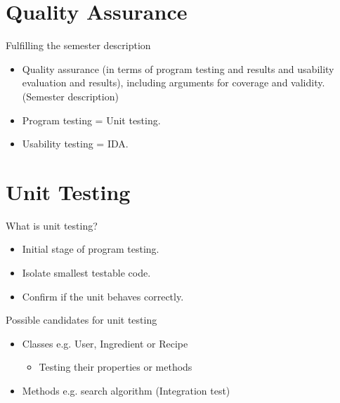 \section{Quality Assurance}

\begin{frame} {Fulfilling the semester description}
	\begin{itemize}
		\item Quality assurance (in terms of program testing and results and usability evaluation and results), including arguments for coverage and validity. {\footnotesize (Semester description)}
		\item Program testing = Unit testing.
		\item Usability testing = IDA.
	\end{itemize}

\end{frame}

\section{Unit Testing}

\begin{frame} {What is unit testing?}
	\begin{itemize}
		\item Initial stage of program testing.
		\item Isolate smallest testable code.
		\item Confirm if the unit behaves correctly.
	\end{itemize}
\end{frame}

\begin{frame} {Possible candidates for unit testing}

	\begin{itemize}
		\item Classes e.g. User, Ingredient or Recipe
			\begin{itemize}
				\item Testing their properties or methods
			\end{itemize}					
		\item Methods e.g. search algorithm (Integration test)
	\end{itemize}

\end{frame}